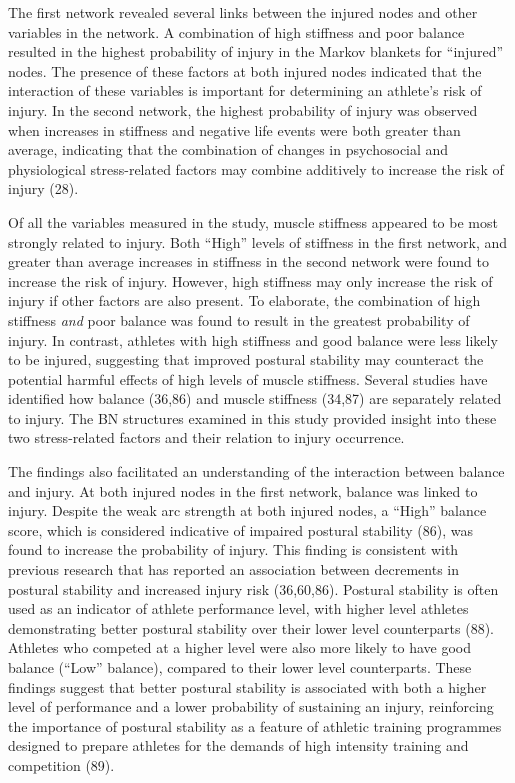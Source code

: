\documentclass[
  english,
  man]{apa6}
\begin{document}
The first network revealed several links between the injured nodes and other variables in the network.
A combination of high stiffness and poor balance resulted in the highest probability of injury in the Markov blankets for ``injured'' nodes.
The presence of these factors at both injured nodes indicated that the interaction of these variables is important for determining an athlete's risk of injury.
In the second network, the highest probability of injury was observed when increases in stiffness and negative life events were both greater than average, indicating that the combination of changes in psychosocial and physiological stress-related factors may combine additively to increase the risk of injury (28).

Of all the variables measured in the study, muscle stiffness appeared to be most strongly related to injury.
Both ``High'' levels of stiffness in the first network, and greater than average increases in stiffness in the second network were found to increase the risk of injury.
However, high stiffness may only increase the risk of injury if other factors are also present.
To elaborate, the combination of high stiffness \emph{and} poor balance was found to result in the greatest probability of injury.
In contrast, athletes with high stiffness and good balance were less likely to be injured, suggesting that improved postural stability may counteract the potential harmful effects of high levels of muscle stiffness.
Several studies have identified how balance (36,86) and muscle stiffness (34,87) are separately related to injury.
The BN structures examined in this study provided insight into these two stress-related factors and their relation to injury occurrence.

The findings also facilitated an understanding of the interaction between balance and injury.
At both injured nodes in the first network, balance was linked to injury.
Despite the weak arc strength at both injured nodes, a ``High'' balance score, which is considered indicative of impaired postural stability (86), was found to increase the probability of injury.
This finding is consistent with previous research that has reported an association between decrements in postural stability and increased injury risk (36,60,86).
Postural stability is often used as an indicator of athlete performance level, with higher level athletes demonstrating better postural stability over their lower level counterparts (88).
Athletes who competed at a higher level were also more likely to have good balance (``Low'' balance), compared to their lower level counterparts.
These findings suggest that better postural stability is associated with both a higher level of performance and a lower probability of sustaining an injury, reinforcing the importance of postural stability as a feature of athletic training programmes designed to prepare athletes for the demands of high intensity training and competition (89).
\end{document}
